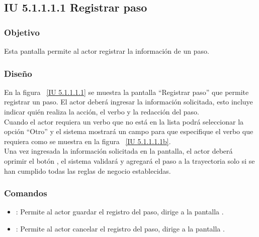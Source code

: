 \newpage 
\subsection{IU 5.1.1.1.1 Registrar paso}

\subsubsection{Objetivo}
	
	Esta pantalla permite al actor registrar la información de un paso.

\subsubsection{Diseño}

    En la figura ~\ref{IU 5.1.1.1.1} se muestra la pantalla ``Registrar paso'' que permite registrar un paso. El actor deberá ingresar la información solicitada, 
    esto incluye indicar quién realiza la acción, el verbo y la redacción del paso.\\
    
    Cuando el actor requiera un verbo que no está en la lista podrá seleccionar la opción ``Otro'' y el sistema mostrará un campo para 
    que especifique el verbo que requiera como se muestra en la figura ~\ref{IU 5.1.1.1.1b}. \\
    
    
    Una vez ingresada la información solicitada en la pantalla, el actor deberá oprimir el botón 
    , el sistema validará y agregará el paso a la trayectoria solo si se han cumplido todas las reglas de negocio establecidas.  \\




\subsubsection{Comandos}
\begin{itemize}
	\item {}: Permite al actor guardar el registro del paso, dirige a la pantalla .
	\item {}: Permite al actor cancelar el registro del paso, dirige a la pantalla .
\end{itemize}

